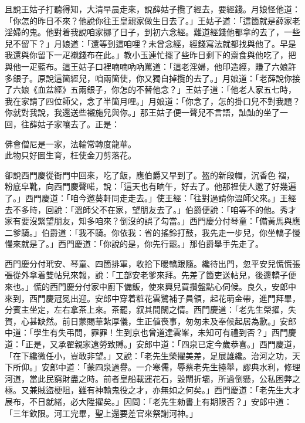 且說王姑子打聽得知，大清早晨走來，說薛姑子攬了經去，要經錢。月娘怪他道：「你怎的昨日不來？他說你往王皇親家做生日去了。」王姑子道：「這箇就是薛家老淫婦的鬼。他對着我說咱家挪了日子，到初六念經。難道經錢他都拿的去了，一些兒不留下？」月娘道：「還等到這咱哩？未曾念經，經錢寫法就都找與他了。早是我還與你留下一疋襯錢布在此。」教小玉連忙擺了些昨日剩下的齋食與他吃了，把與他一疋藍布。這王姑子口裡喃喃吶吶罵道：「這老淫婦，他印造經，賺了六娘許多銀子。原說這箇經兒，咱兩箇使，你又獨自掉攬的去了。」{}月娘道：「老薛說你接了六娘《血盆經》五兩銀子，你怎的不替他念？」王姑子道：「他老人家五七時，我在家請了四位師父，念了半箇月哩。」月娘道：「你念了，怎的掛口兒不對我題？你就對我說，我還送些襯施兒與你。」那王姑子便一聲兒不言語，訕訕的坐了一回，{}往薛姑子家嚷去了。正是：

\begin{myquote} 
佛會僧尼是一家，法輪常轉度龍華。\\此物只好圖生育，枉使金刀剪落花。
\end{myquote} 

卻說西門慶從衙門中回來，吃了飯，應伯爵又早到了。盔的新段帽，沉香色𧜽褶，粉底皁靴，{}向西門慶聲喏，說：「這天也有晌午，好去了。他那裡使人邀了好幾遍了。」西門慶道：「咱今邀葵軒同走走去。」使王經：「往對過請你溫師父來。」王經去不多時，回說：「溫師父不在家，望朋友去了。」伯爵便說：「咱等不的他。秀才家有要沒緊望朋友，知多咱來？倒沒的誤了勾當。」西門慶分付琴童：「備黃馬與應二爹騎。」伯爵道：「我不騎。你依我：省的搖鈴打鼓，我先走一步兒，你坐轎子慢慢來就是了。」西門慶道：「你說的是，你先行罷。」那伯爵舉手先走了。

西門慶分付玳安、琴童、四箇排軍，收拾下暖轎跟隨。纔待出門，忽平安兒慌慌張張從外拿着雙帖兒來報，說：「工部安老爹來拜。先差了箇吏送帖兒，後邊轎子便來也。」慌的西門慶分付家中廚下備飯，使來興兒買攢盤點心伺候。良久，安郎中來到，西門慶冠冕出迎。安郎中穿着粧花雲鷺補子員領，起花萌金帶，進門拜畢，分賓主坐定，左右拿茶上來。茶罷，叙其間闊之情。西門慶道：「老先生榮擢，失賀，心甚缺然。前日蒙賜華紮厚儀，生正値䘮事，匆匆未及奉候起居為歉。」安郎中道：「學生有失弔問，罪罪！生到京也曾道達雲峯，未知可有禮到否？」西門慶道：「正是，又承翟親家遠勞致賻。」{}安郎中道：「四泉已定今歲恭喜。」西門慶道，「在下纔微任小，豈敢非望。」又說：「老先生榮擢美差，足展雄纔。治河之功，天下所仰。」安郎中道：「蒙四泉過譽。一介寒儒，辱蔡老先生擡舉，謬典水利，修理河道，當此民窮財盡之時。前者皇船載運花石，毀閘折壩，所過倒懸，公私困弊之極。又兼賊盜梗阻，雖有神輸鬼役之才，亦無如之何矣。」西門慶道：「老先生大才展布，不日就緒，必大陞擢矣。」因問：「老先生勑書上有期限否？」安郎中道：「三年欽限。河工完畢，聖上還要差官來祭謝河神。」

